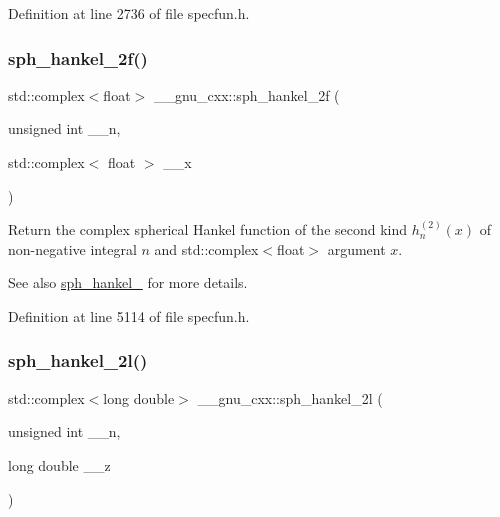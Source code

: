 Definition at line 2736 of file specfun.\+h.

\mbox{\label{group__gnu__math__spec__func_ga4c3194b71831b265811f987cbbf6e031}} 
\subsubsection{\texorpdfstring{sph\+\_\+hankel\+\_\+2f()}{sph\_hankel\_2f()}\hspace{0.1cm}{\footnotesize\ttfamily [2/2]}}
{\footnotesize\ttfamily std\+::complex$<$float$>$ \+\_\+\+\_\+gnu\+\_\+cxx\+::sph\+\_\+hankel\+\_\+2f (\begin{DoxyParamCaption}\item[{unsigned int}]{\+\_\+\+\_\+n,  }\item[{std\+::complex$<$ float $>$}]{\+\_\+\+\_\+x }\end{DoxyParamCaption})\hspace{0.3cm}{\ttfamily [inline]}}

Return the complex spherical Hankel function of the second kind $ h^{(2)}_n(x) $ of non-\/negative integral $ n $ and {\ttfamily std\+::complex$<$float$>$} argument $ x $.

\begin{DoxySeeAlso}{See also}
\hyperlink{group__gnu__math__spec__func_ga1ca08866a25e3637b04c57ff5a0c36a5}{sph\+\_\+hankel\+\_} for more details. 
\end{DoxySeeAlso}


Definition at line 5114 of file specfun.\+h.

\mbox{\label{group__gnu__math__spec__func_ga6d3ead73a4f0bfeeb0aa1fd99daaf3b1}} 
\subsubsection{\texorpdfstring{sph\+\_\+hankel\+\_\+2l()}{sph\_hankel\_2l()}\hspace{0.1cm}{\footnotesize\ttfamily [1/2]}}
{\footnotesize\ttfamily std\+::complex$<$long double$>$ \+\_\+\+\_\+gnu\+\_\+cxx\+::sph\+\_\+hankel\+\_\+2l (\begin{DoxyParamCaption}\item[{unsigned int}]{\+\_\+\+\_\+n,  }\item[{long double}]{\+\_\+\+\_\+z }\end{DoxyParamCaption})\hspace{0.3cm}{\ttfamily [inline]}}

